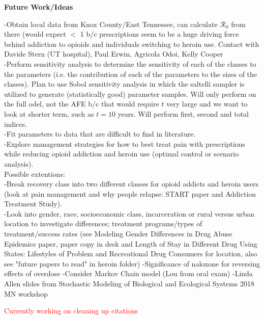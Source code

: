 \documentclass[12pt]{article}
\begin{document}

\textbf{Future Work/Ideas} 


-Obtain local data from Knox County/East Tennessee, can calculate $\mathscr{R}_0$ from there (would expect $<$ 1 b/c prescriptions seem to be a huge driving force behind addiction to opioids and individuals switching to heroin use. Contact with Davide Stern (UT hospital), Paul Erwin, Agricola Odoi, Kelly Cooper\\
-Perform sensitivity analysis to determine the sensitivity of each of the classes to the parameters (i.e. the contribution of each of the parameters to the sizes of the classes). Plan to use Sobol sensitivity analysis in which the saltelli sampler is utilized to generate (statistically good) parameter samples. Will only perform on the full  odel, not the AFE b/c that would require $t$ very large and we want to look at shorter term, such as $t=10$ years. Will perform first, second and total indices. \\
-Fit parameters to data that are difficult to find in literature. \\
-Explore management strategies for how to best treat pain with prescriptions while reducing opioid addiction and heroin use (optimal control or scenario analysis).  \\
Possible extentions: \\
-Break recovery class into two different classes for opioid addicts and heroin users (look at pain management and why people relapse: START paper and Addiction Treatment Study). \\
-Look into gender, race, socioeconomic class, incarceration or rural versus urban location to investigate differences; treatment programs/types of treatment/success rates (see Modeling Gender Differences in Drug Abuse Epidemics paper, paper copy in desk and Length of Stay in Different Drug Using States: Lifestyles of Problem and Recreational Drug Consumers for location, also see "future papers to read" in heroin folder)%
-Significance of naloxone for reversing effects of overdose 
-Consider Markov Chain model (Lou from oral exam) 
-Linda Allen slides from Stochastic Modeling of Biological and Ecological Systems 2018 MN workshop 


\pagebreak

\textcolor{red}{Currently working on cleaning up citations} 


 
\end{document}
